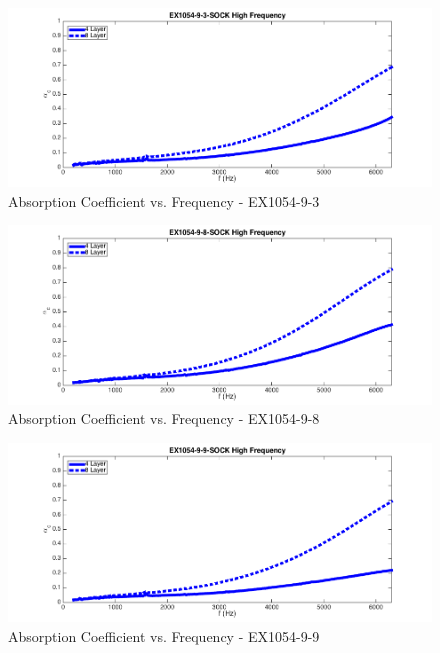 \begin{figure}[hbtp]
    \centering
    \includegraphics[width=1\textwidth]{Chapter-4/figs/AfigSOCK9-3}
    \caption{Absorption Coefficient vs. Frequency - EX1054-9-3}
    \label{fig:AfigSOCK9-3}
\end{figure}

\begin{figure}[hbtp]
    \centering
    \includegraphics[width=1\textwidth]{Chapter-4/figs/AfigSOCK9-8}
    \caption{Absorption Coefficient vs. Frequency - EX1054-9-8}
    \label{fig:AfigSOCK9-8}
\end{figure}

\begin{figure}[hbtp]
    \centering
    \includegraphics[width=1\textwidth]{Chapter-4/figs/AfigSOCK9-9}
    \caption{Absorption Coefficient vs. Frequency - EX1054-9-9}
    \label{fig:AfigSOCK9-9}
\end{figure}

